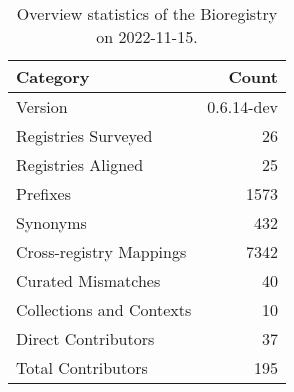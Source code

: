 \begin{table}
\centering
\caption{Overview statistics of the Bioregistry on 2022-11-15.}
\label{tab:bioregistry-summary}
\begin{tabular}{lr}
\toprule
                Category &      Count \\
\midrule
                 Version & 0.6.14-dev \\
     Registries Surveyed &         26 \\
      Registries Aligned &         25 \\
                Prefixes &       1573 \\
                Synonyms &        432 \\
 Cross-registry Mappings &       7342 \\
      Curated Mismatches &         40 \\
Collections and Contexts &         10 \\
     Direct Contributors &         37 \\
      Total Contributors &        195 \\
\bottomrule
\end{tabular}
\end{table}
